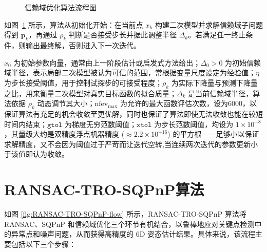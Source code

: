 \begin{figure}[htbp]
	\caption{信赖域优化算法流程图}
	\label{fig:TRO_flowchart}
\end{figure}



如图~\ref{fig:TRO_flowchart} 所示，算法从初始化开始：在当前点 $x_k$ 构建二次模型并求解信赖域子问题得到 $\mathbf{p}_k$，再通过 $\rho_k$ 判断是否接受步长并据此调整半径 $\Delta_k$。若满足任一终止条件，则输出最终解，否则进入下一次迭代。

$x_0$ 为初始参数向量，通常由上一阶段估计或启发式方法给出；$\Delta_0>0$ 为初始信赖域半径，表示局部二次模型被认为可信的范围，常根据变量尺度设定为经验值；$\eta$ 为步长接受阈值，用于控制试探步的可接受程度；$\rho_k$ 为实际下降量与预测下降量之比，用来衡量二次模型对真实目标函数的拟合质量；$\Delta_k$ 是当前信赖域半径，算法依据 $\rho_k$ 动态调节其大小；$\mathrm{nfev}_{\max}$ 为允许的最大函数评估次数，设为6000，以保证算法有充足的机会收敛至更优解，同时也保证了算法即使无法收敛也能在较短时间内结束；$\texttt{gtol}$ 为梯度无穷范数阈值；$\texttt{xtol}$ 为步长范数阈值，均设为 $1\times10^{-8}$，其量级大约是双精度浮点机器精度 ($\approx2.2\times10^{-16}$) 的平方根——足够小以保证求解精度，又不会因为阈值过于严苛而让迭代空转,当连续两次迭代的参数更新小于该值即认为收敛。

\section{RANSAC-TRO-SQPnP算法}
\label{sec:RANSAC-TRO-SQPnP:algorithm}

如图 \ref{fig:RANSAC-TRO-SQPnP-flow} 所示，RANSAC-TRO-SQPnP 算法将 RANSAC、SQPnP 和信赖域优化三个环节有机结合，以鲁棒地应对关键点检测中的异常点和噪声问题，从而获得高精度的 6D 姿态估计结果。具体来说，该流程主要包括以下三个步骤：

